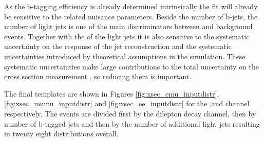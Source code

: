 As the b-tagging efficiency is already determined intrinsically the fit will already be sensitive to the related nuisance parameters.
Beside the number of b-jets, the number of light jets is one of the main discriminators between \ttbar and background events.
Together with the \pt of the light jets it is also sensitive to the systematic uncertainty on the response of the jet reconstruction and
the systematic uncertainties introduced by theoretical assumptions in the simulation.
These systematic uncertainties make large contributions to the total uncertainty on the \ttbar cross section measurement , so reducing them is important.

The final templates are shown in Figures \ref{fig:xsec_emu_inputdistr},\ref{fig:xsec_mumu_inputdistr} and \ref{fig:xsec_ee_inputdistr} for the \emu,\mumu and \ee channel respectively. The events are divided first by the dilepton decay channel, then by number of b-tagged jets and 
then by the number of additional light jets resulting in twenty eight distributions overall.

